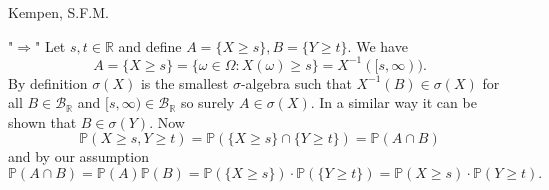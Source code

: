 \begin{solution}[5.3]{Kempen, S.F.M.}

    \noindent "$\Rightarrow$" Let $s,t\in \mathbb{R}$ and define $A = \{X \geq s\}, B = \{Y \geq t\}$. We have
    $$ A = \{X \geq s\} = \{\omega\in \Omega: X(\omega) \geq s\} = X^{-1}([s,\infty)). $$
    By definition $\sigma(X)$ is the smallest $\sigma$-algebra such that $X^{-1}(B)\in \sigma(X)$ for all $B\in \mathcal{B}_\mathbb{R}$ and $[s,\infty)\in \mathcal{B}_\mathbb{R}$ so surely $A\in \sigma(X)$. In a similar way it can be shown that $B\in \sigma(Y)$. Now
    $$ \mathbb{P}(X\geq s, Y\geq t) = \mathbb{P}(\{X\geq s\} \cap \{Y\geq t\}) = \mathbb{P}(A\cap B) $$
    and by our assumption
    $$ \mathbb{P}(A\cap B)  = \mathbb{P}(A) \mathbb{P}(B) = \mathbb{P}(\{X\geq s\})\cdot\mathbb{P}(\{Y\geq t\}) = \mathbb{P}(X\geq s)\cdot\mathbb{P}(Y\geq t). $$
    

\end{solution}
